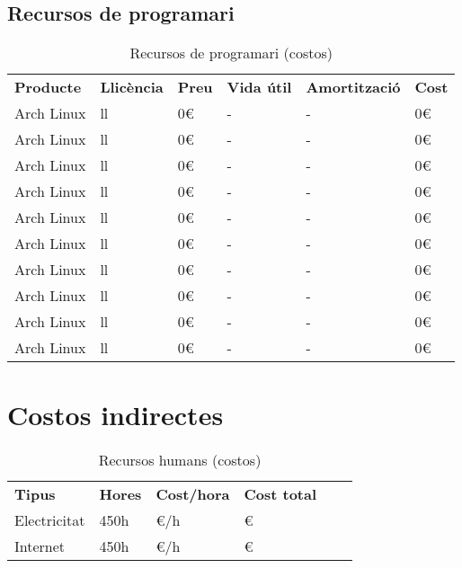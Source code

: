 	\subsection{Recursos de programari}

		\begin{table}[H]
			\begin{center}
				\begin{tabular}{l !{\vrule width -1pt}l !{\vrule width -1pt}l !{\vrule width -1pt}l !{\vrule width -1pt}l !{\vrule width -1pt}l}
					\textbf{Producte} & \textbf{Llicència} & \textbf{Preu} & \textbf{Vida útil} & \textbf{Amortització} & \textbf{Cost} \\
					Arch Linux & ll & 0€ & - & - & 0€ \\
					Arch Linux & ll & 0€ & - & - & 0€ \\
					Arch Linux & ll & 0€ & - & - & 0€ \\
					Arch Linux & ll & 0€ & - & - & 0€ \\
					Arch Linux & ll & 0€ & - & - & 0€ \\
					Arch Linux & ll & 0€ & - & - & 0€ \\
					Arch Linux & ll & 0€ & - & - & 0€ \\
					Arch Linux & ll & 0€ & - & - & 0€ \\
					Arch Linux & ll & 0€ & - & - & 0€ \\
					Arch Linux & ll & 0€ & - & - & 0€ \\
				\end{tabular}
			\end{center}
			\caption{Recursos de programari (costos)}
		\end{table}




\section{Costos indirectes}
	\begin{table}[H]
		\begin{center}
			\begin{tabular}{l !{\vrule width -1pt}l !{\vrule width -1pt}l !{\vrule width -1pt}l !{\vrule width -1pt}l !{\vrule width -1pt}l}
				\textbf{Tipus} & \textbf{Hores} & \textbf{Cost/hora} & \textbf{Cost total} \\
				Electricitat & 450h & €/h & € \\
				Internet & 450h & €/h & € \\
			\end{tabular}
		\end{center}
		\caption{Recursos humans (costos)}
	\end{table}

